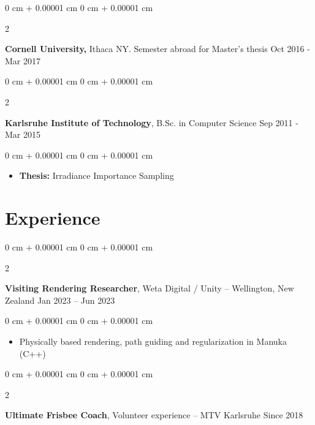 \documentclass[10pt, letterpaper]{article}
\newenvironment{highlights}{
    \begin{itemize}[
        topsep=0.10 cm,
        parsep=0.10 cm,
        partopsep=0pt,
        itemsep=0pt,
        leftmargin=0 cm + 10pt
    ]
}{
    \end{itemize}
} %
\newenvironment{onecolentry}{
    \begin{adjustwidth}{
        0 cm + 0.00001 cm
    }{
        0 cm + 0.00001 cm
    }
}{
    \end{adjustwidth}
} %
\newenvironment{twocolentry}[2][]{
    \onecolentry
    \def\secondColumn{#2}
    \setcolumnwidth{\fill, 4.5 cm}
    \begin{paracol}{2}
}{
    \switchcolumn \raggedleft \secondColumn
    \end{paracol}
    \endonecolentry
} %
\begin{document}
        \educspace   
        
        \begin{twocolentry}{
            Oct 2016 - Mar 2017
        }
            \textbf{Cornell University,} Ithaca NY. Semester abroad for Master's thesis\end{twocolentry}

        \educspace

        \begin{twocolentry}{
            Sep 2011 - Mar 2015
        }
            \textbf{Karlsruhe Institute of Technology}, B.Sc. in Computer Science\end{twocolentry}

        \vspace{0.10 cm}
        \begin{onecolentry}
            \begin{highlights}
            \item \textbf{Thesis:} Irradiance Importance Sampling
            \end{highlights}
        \end{onecolentry}

    
    \sectionspace
    \section{Experience}
      \sectspacetop
        \begin{twocolentry}{
            Jan 2023 – Jun 2023
        }
            \textbf{Visiting Rendering Researcher}, Weta Digital / Unity -- Wellington, New Zealand\end{twocolentry}

        \vspace{0.10 cm}
        \begin{onecolentry}
            \begin{highlights}
                \item Physically based rendering, path guiding and regularization in Manuka (C++)
            \end{highlights}
        \end{onecolentry}

        \expspace
      
        \begin{twocolentry}{
            Since 2018
        }
            \textbf{Ultimate Frisbee Coach}, Volunteer experience -- MTV Karlsruhe\end{twocolentry}
\end{document}
